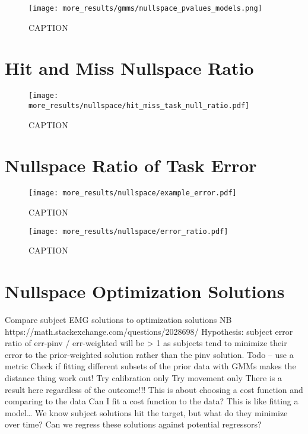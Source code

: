 \documentclass[../main.tex]{subfiles}
\begin{document}
\begin{figure}[tph]
  \centering
  \texttt{[image: more\_results/gmms/nullspace\_pvalues\_models.png]}
  \caption[GMM nullspace significance matrix]{CAPTION}\label{fig:nullspace_pvalues_gmms}
\end{figure}

\section{Hit and Miss Nullspace Ratio}

\begin{figure}[tph]
  \centering
    \texttt{[image: more\_results/nullspace/hit\_miss\_task\_null\_ratio.pdf]}
    \caption[Task-null variance ratio of hits and misses]{CAPTION}\label{fig:hit_miss_nullspace}
\end{figure}


\section{Nullspace Ratio of Task Error}

\begin{figure}[tph]
  \centering
    \texttt{[image: more\_results/nullspace/example\_error.pdf]}
    \caption[Example Error]{CAPTION}\label{fig:example_error}
\end{figure}

\begin{figure}[tph]
  \centering
    \texttt{[image: more\_results/nullspace/error\_ratio.pdf]}
    \caption[Error Nullspace]{CAPTION}\label{fig:error_nullspace_subjects}
\end{figure}


\section{Nullspace Optimization Solutions}

Compare subject EMG solutions to optimization solutions
NB https://math.stackexchange.com/questions/2028698/
Hypothesis: subject error ratio of err-pinv / err-weighted will be > 1 as subjects tend to minimize their error to the prior-weighted solution rather than the pinv solution.
Todo – use a metric
Check if fitting different subsets of the prior data with GMMs makes the distance thing work out! 
Try calibration only
Try movement only
There is a result here regardless of the outcome!!!
This is about choosing a cost function and comparing to the data
Can I fit a cost function to the data? This is like fitting a model… 
We know subject solutions hit the target, but what do they minimize over time?
Can we regress these solutions against potential regressors?
\end{document}
